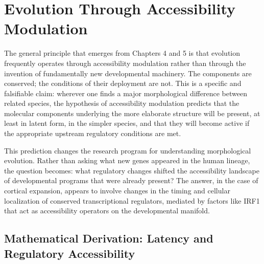 \documentclass[12pt, a4paper, openany]{book}
\theoremstyle{definition}
\theoremstyle{remark}
\begin{document}
\section{Evolution Through Accessibility Modulation}

The general principle that emerges from Chapters 4 and 5 is that evolution frequently operates through accessibility modulation rather than through the invention of fundamentally new developmental machinery. The components are conserved; the conditions of their deployment are not. This is a specific and falsifiable claim: wherever one finds a major morphological difference between related species, the hypothesis of accessibility modulation predicts that the molecular components underlying the more elaborate structure will be present, at least in latent form, in the simpler species, and that they will become active if the appropriate upstream regulatory conditions are met.

This prediction changes the research program for understanding morphological evolution. Rather than asking what new genes appeared in the human lineage, the question becomes: what regulatory changes shifted the accessibility landscape of developmental programs that were already present? The answer, in the case of cortical expansion, appears to involve changes in the timing and cellular localization of conserved transcriptional regulators, mediated by factors like IRF1 that act as accessibility operators on the developmental manifold.

\subsection*{Mathematical Derivation: Latency and Regulatory Accessibility}
\end{document}
